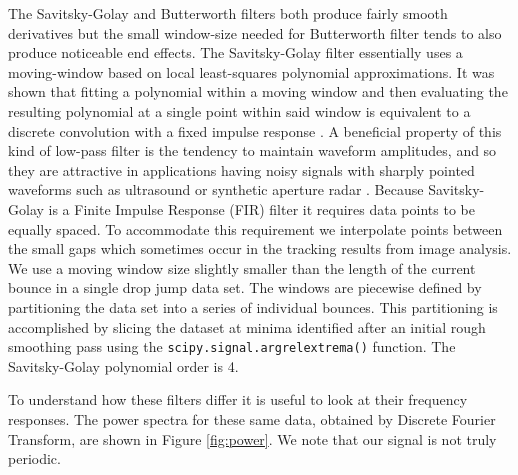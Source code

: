 \documentclass[12pt,a4paper,oneside]{book}
\begin{document}
The Savitsky-Golay and Butterworth filters both produce fairly smooth derivatives but the small window-size needed for Butterworth filter tends to also produce noticeable end effects. The Savitsky-Golay filter essentially uses a moving-window based on local least-squares polynomial approximations. It was shown that fitting a polynomial within a moving window and then evaluating the resulting polynomial at a single point within said window is equivalent to a discrete convolution with a fixed impulse response \cite{savitzky_smoothing_1964}. A beneficial property of this kind of low-pass filter is the tendency to maintain waveform amplitudes, and so they are attractive in applications having noisy signals with sharply pointed waveforms such as ultrasound or synthetic aperture radar \cite{schafer_what_2011}. Because Savitsky-Golay is a Finite Impulse Response (FIR) filter it requires data points to be equally spaced. To accommodate this requirement we interpolate points between the small gaps which sometimes occur in the tracking results from image analysis. We use a moving window size slightly smaller than the length of the current bounce in a single drop jump data set. The windows are piecewise defined by partitioning the data set into a series of individual bounces. This partitioning is accomplished by slicing the dataset at minima identified after an initial rough smoothing pass using the \verb|scipy.signal.argrelextrema()| function. The Savitsky-Golay polynomial order is 4. 

To understand how these filters differ it is useful to look at their frequency responses. The power spectra for these same data, obtained by Discrete Fourier Transform, are shown in Figure \ref{fig:power}. We note that our signal is not truly periodic. 
\end{document}
